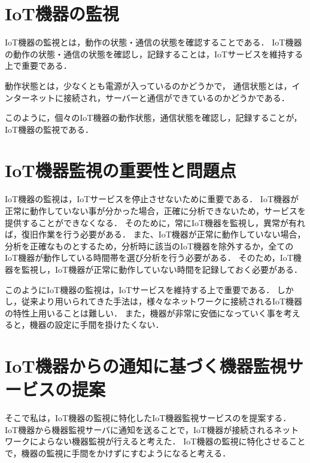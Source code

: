 \section{IoT機器の監視}%
IoT機器の監視とは，動作の状態・通信の状態を確認することである．
IoT機器の動作の状態・通信の状態を確認し，記録することは，IoTサービスを維持する上で重要である．

動作状態とは，少なくとも電源が入っているのかどうかで，
通信状態とは，インターネットに接続され，サーバーと通信ができているのかどうかである．
\medskip

このように，個々のIoT機器の動作状態，通信状態を確認し，記録することが，IoT機器の監視である．

\section{IoT機器監視の重要性と問題点}
IoT機器の監視は，IoTサービスを停止させないために重要である．
IoT機器が正常に動作していない事が分かった場合，正確に分析できないため，サービスを提供することができなくなる．
そのために，常にIoT機器を監視し，異常が有れば，復旧作業を行う必要がある．
また、IoT機器が正常に動作していない場合，分析を正確なものとするため，分析時に該当のIoT機器を除外するか，全てのIoT機器が動作している時間帯を選び分析を行う必要がある．
そのため，IoT機器を監視し，IoT機器が正常に動作していない時間を記録しておく必要がある．
\medskip

このようにIoT機器の監視は，IoTサービスを維持する上で重要である．
しかし，従来より用いられてきた手法は，様々なネットワークに接続されるIoT機器の特性上用いることは難しい．
また，機器が非常に安価になっていく事を考えると，機器の設定に手間を掛けたくない．

\section{IoT機器からの通知に基づく機器監視サービスの提案}
そこで私は，IoT機器の監視に特化したIoT機器監視サービスのを提案する．
IoT機器から機器監視サーバに通知を送ることで，IoT機器が接続されるネットワークによらない機器監視が行えると考えた．
IoT機器の監視に特化させることで，機器の監視に手間をかけずにすむようになると考える．


